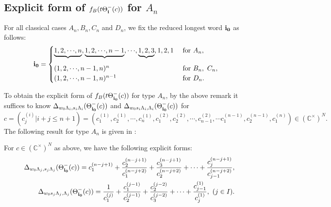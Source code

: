 \subsection{Explicit form of 
$f_B(t\Theta_{\bf i}^-(c))$ for $A_n$}
\label{fb-An}

For all classical cases $A_n,B_n,C_n$ and $D_n$,
we fix the reduced longest word $\bfii0$ as follows:
\begin{equation}
\bfii0
=\begin{cases}\underbrace{1,2,{\cdots},n}_{},
\underbrace{1,2,{\cdots},n-1}_{},{\cdots},\underbrace{1,2,3}_{},1,2,1&\text{ for
  }A_n,\\
(1,2,{\cdots},n-1,n)^n&\text{ for }B_n,\,\,C_n,\\
(1,2,{\cdots},n-1,n)^{n-1}&\text{ for }D_n.
\end{cases}
\end{equation}

To obtain the explicit form of $f_B(t\Theta_{\bf i_0}^-(c))$ for type
$A_n$, 
by the above remark it suffices to know 
${\Delta}_{w_0{\Lambda}_i,s_i{\Lambda}_i}(\Theta_{\bf i_0}^-(c))$ and 
${\Delta}_{w_0s_i{\Lambda}_i,{\Lambda}_i}(\Theta_{\bf i_0}^-(c))$ for 
\[
c=(c^{(i)}_j|i+j\leq n+1)=
(c^{(1)}_1,c^{(1)}_2,{\cdots},c^{(1)}_n,c^{(2)}_1,c^{(2)}_2,{\cdots},c^{(2)}_{n-1},{\cdots}
c^{(n-1)}_1,c^{(n-1)}_2,c^{(n)}_1)\in ({\mathbb C}^\times)^N.
\]
The following result for type $A_n$ is given in \cite{N4}:
\begin{thm}[\cite{N4}]
\label{thm-a}
For $c\in ({\mathbb C}^\times)^N$ as above, 
we have the following explicit forms:
\begin{eqnarray}
&&{\Delta}_{w_0{\Lambda}_j,s_j{\Lambda}_j}(\Theta_\bfii0^-(c))=
c^{(n-j+1)}_1+\frac{c^{(n-j+1)}_2}{c^{(n-j+2)}_1}
+\frac{c^{(n-j+1)}_3}{c^{(n-j+2)}_2}
+{\cdots}+\frac{c^{(n-j+1)}_j}{c^{(n-j+2)}_{j-1}}, 
\label{del1}\\
&&{\Delta}_{w_0s_j{\Lambda}_j,{\Lambda}_j}(\Theta_\bfii0^-(c))=
\frac{1}{c^{(j)}_1}+
\frac{c^{(j-1)}_1}{c^{(j-1)}_2}+\frac{c^{(j-2)}_2}{c^{(j-2)}_3}
+{\cdots}+\frac{c^{(1)}_{j-1}}{c^{(1)}_j},\,\,
(j\in I).
\label{del2}
\end{eqnarray}
\end{thm}

